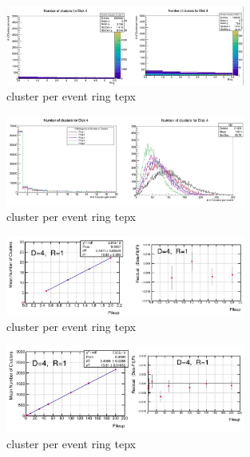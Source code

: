 \begin{figure}[!htp]
\centering
\includegraphics[width=0.7\textwidth]{ashish_thesis/clusters_tepx_disk4.png}
\caption{%
  cluster per event ring tepx 
}
\label{fig:cluster_ring}
\end{figure}


\begin{figure}[!htp]
\centering
\includegraphics[width=0.7\textwidth]{ashish_thesis/clusters_tepx_pu10_allrings.png}
\caption{%
  cluster per event ring tepx 
}
\label{fig:cluster_ring}
\end{figure}

\begin{figure}[!htp]
\centering
\includegraphics[width=0.7\textwidth]{ashish_thesis/lowpu_clusters_fit_D4R1.png}
\caption{%
  cluster per event ring tepx 
}
\label{fig:cluster_ring}
\end{figure}



\begin{figure}[!htp]
\centering
\includegraphics[width=0.7\textwidth]{ashish_thesis/fit_extrapol_D4R1.png}
\caption{%
  cluster per event ring tepx 
}
\label{fig:cluster_ring}
\end{figure}

